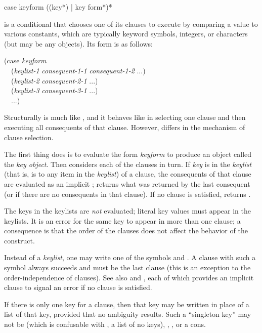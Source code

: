 \begin{defmac}
case keyform {({({key}*) | key} {form}*)}*

 is a conditional that chooses one of its clauses to execute
by comparing a value to various constants, which are
typically keyword symbols, integers, or characters
(but may be any objects).  Its form is as follows:
\begin{lisp}
(case \emph{keyform} \\
~~(\emph{keylist-1} \emph{consequent-1-1} \emph{consequent-1-2} ...) \\
~~(\emph{keylist-2} \emph{consequent-2-1} ...) \\
~~(\emph{keylist-3} \emph{consequent-3-1} ...) \\
~~...)
\end{lisp}
Structurally  is much like ,
and it behaves like 
in selecting one clause and then executing all consequents of that clause.
However,  differs in the mechanism of clause selection.

The first thing  does is to evaluate the form \emph{keyform}
to produce an object called the \emph{key object}.
Then  considers
each of the clauses in turn.  If \emph{key} is in the \emph{keylist}
(that is, is  to any item in the \emph{keylist}) of a clause,
the consequents of that
clause are evaluated as an implicit ;
 returns what was returned by the last
consequent (or {\false} if there are no consequents in that clause).
If no clause is satisfied,  returns {\false}.

The keys in the keylists are \emph{not} evaluated; literal key values
must appear in the keylists.
It is an error for the same key to appear in more than one clause;
a consequence is that the order of the clauses does not affect
the behavior of the  construct.

Instead of a \emph{keylist}, one may write one of the symbols
{\true} and .  A clause with such a symbol
always succeeds and must be the last clause (this is an exception
to the order-independence of clauses).
See also  and , each of which provides
an implicit  clause to signal an error if no clause
is satisfied.

If there is only one key for a clause, then that key may be written
in place of a list of that key, provided that no ambiguity results.
Such a ``singleton key'' may not be {\nil} (which is confusable
with {\emptylist}, a list of no keys), {\true}, , or a cons.
\end{defmac}

